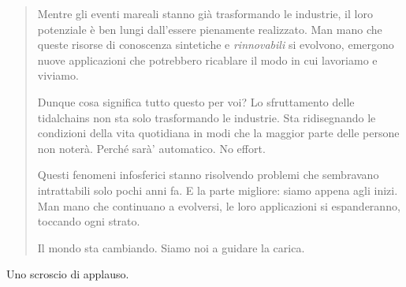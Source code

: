 \begin{quote}
Mentre gli eventi mareali stanno già trasformando le industrie, il loro potenziale è ben lungi dall'essere pienamente realizzato. Man mano che queste risorse di conoscenza sintetiche e \textit{rinnovabili} si evolvono, emergono nuove applicazioni che potrebbero ricablare il modo in cui lavoriamo e viviamo.

Dunque cosa significa tutto questo per voi? Lo sfruttamento delle tidalchains non sta solo trasformando le industrie. Sta ridisegnando le condizioni della vita quotidiana in modi che la maggior parte delle persone non noterà. Perché sarà' automatico. No effort.

Questi fenomeni infosferici stanno risolvendo problemi che sembravano intrattabili solo pochi anni fa. E la parte migliore: siamo appena agli inizi. Man mano che continuano a evolversi, le loro applicazioni si espanderanno, toccando ogni strato.

Il mondo sta cambiando. Siamo noi a guidare la carica.

\end{quote}

Uno scroscio di applauso.
